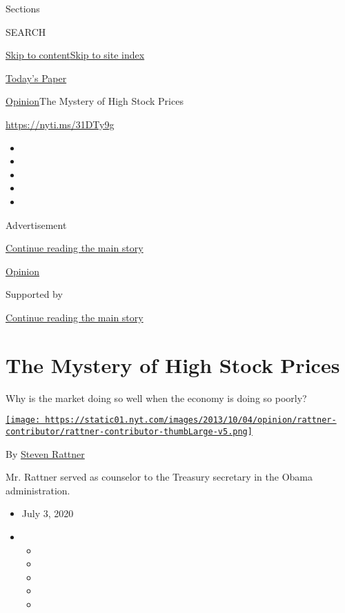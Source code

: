 Sections

SEARCH

\protect\hyperlink{site-content}{Skip to
content}\protect\hyperlink{site-index}{Skip to site index}

\href{https://myaccount.nytimes.com/auth/login?response_type=cookie\&client_id=vi}{}

\href{https://www.nytimes.com/section/todayspaper}{Today's Paper}

\href{/section/opinion}{Opinion}\textbar{}The Mystery of High Stock
Prices

\href{https://nyti.ms/31DTy9g}{https://nyti.ms/31DTy9g}

\begin{itemize}
\item
\item
\item
\item
\item
\end{itemize}

Advertisement

\protect\hyperlink{after-top}{Continue reading the main story}

\href{/section/opinion}{Opinion}

Supported by

\protect\hyperlink{after-sponsor}{Continue reading the main story}

\hypertarget{the-mystery-of-high-stock-prices}{%
\section{The Mystery of High Stock
Prices}\label{the-mystery-of-high-stock-prices}}

Why is the market doing so well when the economy is doing so poorly?

\href{https://www.nytimes.com/topic/person/steven-rattner}{\texttt{[image: https://static01.nyt.com/images/2013/10/04/opinion/rattner-contributor/rattner-contributor-thumbLarge-v5.png]}}

By \href{https://www.nytimes.com/topic/person/steven-rattner}{Steven
Rattner}

Mr. Rattner served as counselor to the Treasury secretary in the Obama
administration.

\begin{itemize}
\item
  July 3, 2020
\item
  \begin{itemize}
  \item
  \item
  \item
  \item
  \item
  \end{itemize}
\end{itemize}

